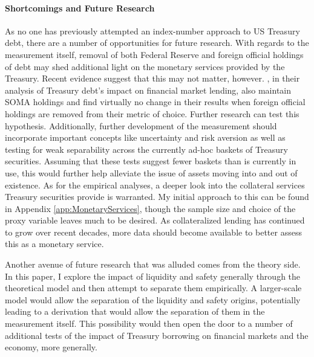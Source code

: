 \documentclass[11pt,a4paper,margin=1.5in]{article}
\begin{document}
\paragraph{Shortcomings and Future Research}
As no one has previously attempted an index-number approach to US Treasury debt, there are a number of opportunities for future research.
With regards to the measurement itself, removal of both Federal Reserve and foreign official holdings of debt may shed additional light on the monetary services provided by the Treasury.
Recent evidence suggest that this may not matter, however. 
\citet{Krishnamurthy-VissingJorgensen:2015}, in their analysis of Treasury debt's impact on financial market lending, also maintain SOMA holdings and find virtually no change in their results when foreign official holdings are removed from their metric of choice.
Further research can test this hypothesis. 
Additionally, further development of the measurement should incorporate important concepts like uncertainty and risk aversion as well as testing for weak separability across the currently ad-hoc baskets of Treasury securities.
Assuming that these tests suggest fewer baskets than is currently in use, this would further help alleviate the issue of assets moving into and out of existence. 
As for the empirical analyses, a deeper look into the collateral services Treasury securities provide is warranted.
My initial approach to this can be found in Appendix \ref{app:MonetaryServices}, though the sample size and choice of the proxy variable leaves much to be desired.
As collateralized lending has continued to grow over recent decades, more data should become available to better assess this as a monetary service. 

Another avenue of future research that was alluded comes from the theory side.
In this paper, I explore the impact of liquidity and safety generally through the theoretical model and then attempt to separate them empirically. 
A larger-scale model would allow the separation of the liquidity and safety origins, potentially leading to a derivation that would allow the separation of them in the measurement itself. 
This possibility would then open the door to a number of additional tests of the impact of Treasury borrowing on financial markets and the economy, more generally.

\newpage



\end{document}
